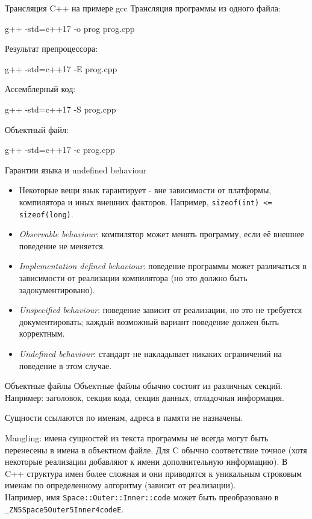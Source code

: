\documentclass{beamer}
\begin{document}
\begin{frame}[fragile]{Трансляция C++ на примере gcc}
Трансляция программы из одного файла:
\begin{cmdline}
g++ -std=c++17 -o prog prog.cpp
\end{cmdline}
Результат препроцессора:
\begin{cmdline}
g++ -std=c++17 -E prog.cpp
\end{cmdline}
Ассемблерный код:
\begin{cmdline}
g++ -std=c++17 -S prog.cpp
\end{cmdline}
Объектный файл:
\begin{cmdline}
g++ -std=c++17 -c prog.cpp
\end{cmdline}
\end{frame}

\begin{frame}{Гарантии языка и undefined behaviour}
\begin{itemize}
  \item Некоторые вещи язык гарантирует - вне зависимости от платформы, компилятора и иных внешних факторов. Например, \lstinline[basicstyle=\ttfamily\small]{sizeof(int) <= sizeof(long)}.
  \item \emph{Observable behaviour}: компилятор может менять программу, если её внешнее поведение не меняется.
  \item \emph{Implementation defined behaviour}: поведение программы может различаться в зависимости от реализации компилятора (но это должно быть задокументировано).
  \item \emph{Unspecified behaviour}: поведение зависит от реализации, но это не требуется документировать; каждый возможный вариант поведение должен быть корректным.
  \item \emph{Undefined behaviour}: стандарт не накладывает никаких ограничений на поведение в этом случае.
\end{itemize}
\end{frame}

\begin{frame}{Объектные файлы}
Объектные файлы обычно состоят из различных секций. Например: заголовок, секция кода, секция данных, отладочная информация.

Сущности ссылаются по именам, адреса в памяти не назначены.

Mangling: имена сущностей из текста программы не всегда могут быть перенесены в имена в объектном файле. Для C обычно соответствие точное (хотя некоторые реализации добавляют к имени дополнительную информацию). В C++ структура имен более сложная и они приводятся к уникальным строковым именам по определенному алгоритму (зависит от реализации).\\
Например, имя \lstinline[basicstyle=\ttfamily\small]{Space::Outer::Inner::code} может быть преобразовано в \lstinline[basicstyle=\ttfamily\small]{_ZN5Space5Outer5Inner4codeE}.
\end{frame}
\end{document}
